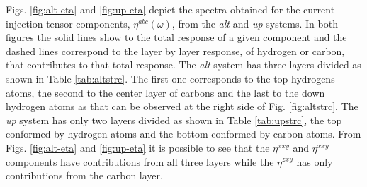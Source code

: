 \documentclass[pss]{wiley2sp} %
\begin{document}
Figs. \ref{fig:alt-eta} and \ref{fig:up-eta} depict the spectra obtained for the current injection tensor components, $\eta^{abc}(\omega)$, from the \emph{alt} and \emph{up} systems. In both figures the solid lines show to the total response of a given component and the dashed lines correspond to the layer by layer response, of hydrogen or carbon, that contributes to that total response. The \emph{alt} system has three layers divided as shown in Table \ref{tab:altstrc}. The first one corresponds to the top hydrogens atoms, the second to the center layer of carbons and the last to the down hydrogen atoms as that can be observed at the right side of Fig. \ref{fig:altstrc}. The \emph{up} system has only two layers divided as shown in Table \ref{tab:upstrc}, the top conformed by hydrogen atoms and the bottom conformed by carbon atoms. From Figs. \ref{fig:alt-eta} and \ref{fig:up-eta} it is possible to see that the $\eta^{xxy}$ and $\eta^{xxy}$ components have contributions from all three layers while the $\eta^{zxy}$ has only contributions from the carbon layer.
\end{document}
